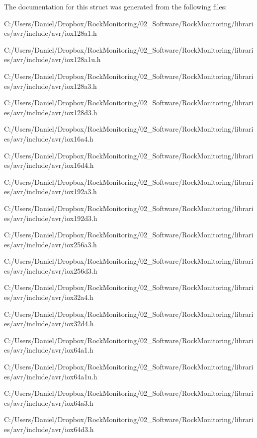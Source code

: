 The documentation for this struct was generated from the following files\+:\begin{DoxyCompactItemize}
\item 
C\+:/\+Users/\+Daniel/\+Dropbox/\+Rock\+Monitoring/02\+\_\+\+Software/\+Rock\+Monitoring/libraries/avr/include/avr/iox128a1.\+h\item 
C\+:/\+Users/\+Daniel/\+Dropbox/\+Rock\+Monitoring/02\+\_\+\+Software/\+Rock\+Monitoring/libraries/avr/include/avr/iox128a1u.\+h\item 
C\+:/\+Users/\+Daniel/\+Dropbox/\+Rock\+Monitoring/02\+\_\+\+Software/\+Rock\+Monitoring/libraries/avr/include/avr/iox128a3.\+h\item 
C\+:/\+Users/\+Daniel/\+Dropbox/\+Rock\+Monitoring/02\+\_\+\+Software/\+Rock\+Monitoring/libraries/avr/include/avr/iox128d3.\+h\item 
C\+:/\+Users/\+Daniel/\+Dropbox/\+Rock\+Monitoring/02\+\_\+\+Software/\+Rock\+Monitoring/libraries/avr/include/avr/iox16a4.\+h\item 
C\+:/\+Users/\+Daniel/\+Dropbox/\+Rock\+Monitoring/02\+\_\+\+Software/\+Rock\+Monitoring/libraries/avr/include/avr/iox16d4.\+h\item 
C\+:/\+Users/\+Daniel/\+Dropbox/\+Rock\+Monitoring/02\+\_\+\+Software/\+Rock\+Monitoring/libraries/avr/include/avr/iox192a3.\+h\item 
C\+:/\+Users/\+Daniel/\+Dropbox/\+Rock\+Monitoring/02\+\_\+\+Software/\+Rock\+Monitoring/libraries/avr/include/avr/iox192d3.\+h\item 
C\+:/\+Users/\+Daniel/\+Dropbox/\+Rock\+Monitoring/02\+\_\+\+Software/\+Rock\+Monitoring/libraries/avr/include/avr/iox256a3.\+h\item 
C\+:/\+Users/\+Daniel/\+Dropbox/\+Rock\+Monitoring/02\+\_\+\+Software/\+Rock\+Monitoring/libraries/avr/include/avr/iox256d3.\+h\item 
C\+:/\+Users/\+Daniel/\+Dropbox/\+Rock\+Monitoring/02\+\_\+\+Software/\+Rock\+Monitoring/libraries/avr/include/avr/iox32a4.\+h\item 
C\+:/\+Users/\+Daniel/\+Dropbox/\+Rock\+Monitoring/02\+\_\+\+Software/\+Rock\+Monitoring/libraries/avr/include/avr/iox32d4.\+h\item 
C\+:/\+Users/\+Daniel/\+Dropbox/\+Rock\+Monitoring/02\+\_\+\+Software/\+Rock\+Monitoring/libraries/avr/include/avr/iox64a1.\+h\item 
C\+:/\+Users/\+Daniel/\+Dropbox/\+Rock\+Monitoring/02\+\_\+\+Software/\+Rock\+Monitoring/libraries/avr/include/avr/iox64a1u.\+h\item 
C\+:/\+Users/\+Daniel/\+Dropbox/\+Rock\+Monitoring/02\+\_\+\+Software/\+Rock\+Monitoring/libraries/avr/include/avr/iox64a3.\+h\item 
C\+:/\+Users/\+Daniel/\+Dropbox/\+Rock\+Monitoring/02\+\_\+\+Software/\+Rock\+Monitoring/libraries/avr/include/avr/iox64d3.\+h\end{DoxyCompactItemize}
